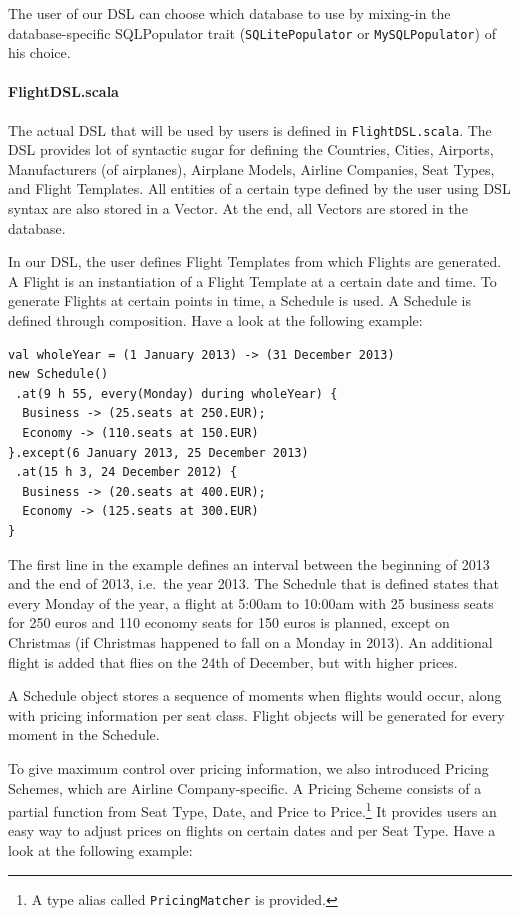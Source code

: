 \documentclass[a4paper]{article}
\newcommand{\cc}[1]{\texttt{#1}}
\renewcommand{\sc}[1]{\lstinline{#1}}
\begin{document}
The user of our DSL can choose which database to use by mixing-in the database-specific SQLPopulator trait (\cc{SQLitePopulator} or \cc{MySQL\-Populator}) of his choice.

\paragraph{FlightDSL.scala}
The actual DSL that will be used by users is defined in \cc{Flight\-DSL.scala}.
The DSL provides lot of syntactic sugar for defining the Countries, Cities, Airports, Manufacturers (of airplanes), Airplane Models, Airline Companies, Seat Types, and Flight Templates.
All entities of a certain type defined by the user using DSL syntax are also stored in a Vector.
At the end, all Vectors are stored in the database.

In our DSL, the user defines Flight Templates from which Flights are generated.
A Flight is an instantiation of a Flight Template at a certain date and time.
To generate Flights at certain points in time, a Schedule is used.
A Schedule is defined through composition.
Have a look at the following example:
\begin{lstlisting}
val wholeYear = (1 January 2013) -> (31 December 2013)
new Schedule()
 .at(9 h 55, every(Monday) during wholeYear) {
  Business -> (25.seats at 250.EUR);
  Economy -> (110.seats at 150.EUR)
}.except(6 January 2013, 25 December 2013)
 .at(15 h 3, 24 December 2012) {
  Business -> (20.seats at 400.EUR);
  Economy -> (125.seats at 300.EUR)
}
\end{lstlisting}

The first line in the example defines an interval between the beginning of 2013 and the end of 2013, i.e.\ the year 2013.
The Schedule that is defined states that every Monday of the year, a flight at 5:00am to 10:00am with 25 business seats for 250 euros and 110 economy seats for 150 euros is planned, except on Christmas (if Christmas happened to fall on a Monday in 2013).
An additional flight is added that flies on the 24th of December, but with higher prices.

A Schedule object stores a sequence of moments when flights would occur, along with pricing information per seat class.
Flight objects will be generated for every moment in the Schedule.

To give maximum control over pricing information, we also introduced Pricing Schemes, which are Airline Company-specific.
A Pricing Scheme consists of a partial function from Seat Type, Date, and Price to Price.\footnote{A type alias called \sc{PricingMatcher} is provided.}
It provides users an easy way to adjust prices on flights on certain dates and per Seat Type.
Have a look at the following example:
\end{document}
